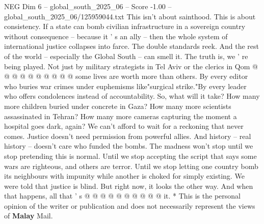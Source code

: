 \begin{textsample}{NEG Dim 6 – global\_south\_2025\_06 – Score -1.00 – global\_south\_2025\_06/125959044.txt}
This isn't about sainthood.
This is about consistency.
If a state can bomb civilian infrastructure in a sovereign country without consequence -- because it ' s an ally -- then the whole system of international justice collapses into farce.
The double standards reek.
And the rest of the world -- especially the Global South -- can smell it.
The truth is, we ' re being played.
Not just by military strategists in Tel Aviv or the clerics in Qom @ @ @ @ @ @ @ @ @ @ some lives are worth more than others.
By every editor who buries war crimes under euphemisms like"surgical strike."By every leader who offers condolences instead of accountability.
So, what will it take?
How many more children buried under concrete in Gaza?
How many more scientists assassinated in Tehran?
How many more cameras capturing the moment a hospital goes dark, again?
We can't afford to wait for a reckoning that never comes.
Justice doesn't need permission from powerful allies.
And history -- real history -- doesn't care who funded the bombs.
The madness won't stop until we stop pretending this is normal.
Until we stop accepting the script that says some wars are righteous, and others are terror.
Until we stop letting one country bomb its neighbours with impunity while another is choked for simply existing.
We were told that justice is blind.
But right now, it looks the other way.
And when that happens, all that ' s @ @ @ @ @ @ @ @ @ @ it. * This is the personal opinion of the writer or publication and does not necessarily represent the views of \textbf{Malay} Mail.

\end{textsample}
